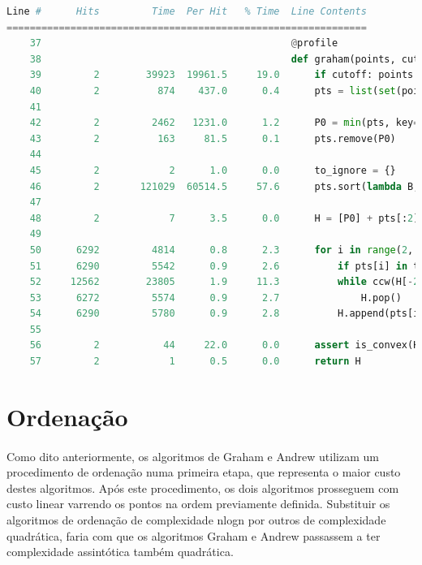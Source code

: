 \documentclass[11pt,a4paper]{article}
\begin{document}
\begin{landscape}
\begin{lstlisting}[language=Python]
Line #      Hits         Time  Per Hit   % Time  Line Contents
==============================================================
    37                                           @profile
    38                                           def graham(points, cutoff=False):
    39         2        39923  19961.5     19.0      if cutoff: points = interior_elimination(points)
    40         2          874    437.0      0.4      pts = list(set(points)) 
    41                                           
    42         2         2462   1231.0      1.2      P0 = min(pts, key=lambda p: (p[1], p[0]))
    43         2          163     81.5      0.1      pts.remove(P0)
    44                                           
    45         2            2      1.0      0.0      to_ignore = {}
    46         2       121029  60514.5     57.6      pts.sort(lambda B, C: compare(P0, B, C, to_ignore))
    47                                           
    48         2            7      3.5      0.0      H = [P0] + pts[:2]
    49                                           
    50      6292         4814      0.8      2.3      for i in range(2, len(pts)):
    51      6290         5542      0.9      2.6          if pts[i] in to_ignore: continue
    52     12562        23805      1.9     11.3          while ccw(H[-2], H[-1], pts[i]) <= 0:
    53      6272         5574      0.9      2.7              H.pop()
    54      6290         5780      0.9      2.8          H.append(pts[i])
    55                                           
    56         2           44     22.0      0.0      assert is_convex(H)
    57         2            1      0.5      0.0      return H
\end{lstlisting}

\end{landscape}



\clearpage
    \section{Ordenação}
    \paragraph{}
    Como dito anteriormente, os algoritmos de Graham e Andrew utilizam um procedimento de ordenação numa primeira etapa, que representa o maior custo destes algoritmos. Após este procedimento, os dois algoritmos prosseguem com custo linear varrendo os pontos na ordem previamente definida. Substituir os algoritmos de ordenação de complexidade nlogn por outros de complexidade quadrática, faria com que os algoritmos Graham e Andrew passassem a ter complexidade assintótica também quadrática.
\end{document}
